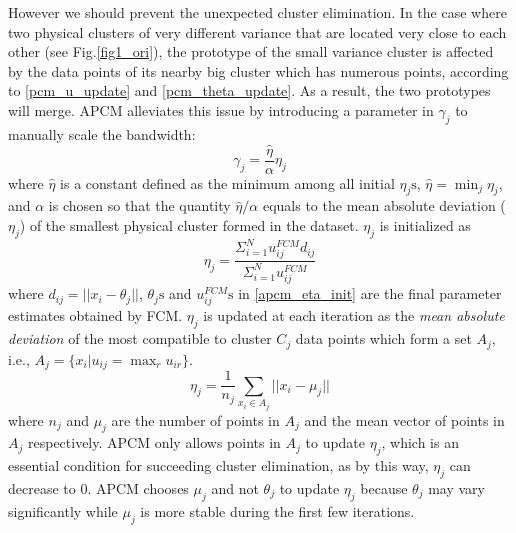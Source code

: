 \documentclass[journal]{IEEEtran}
\theoremstyle{definition}
\begin{document}
However we should prevent the unexpected cluster elimination. In the case where two physical clusters of very different variance that are located very close to each other (see Fig.\ref{fig1_ori}), the prototype of the small variance cluster is affected by the data points of its nearby big cluster which has numerous points, according to \eqref{pcm_u_update} and \eqref{pcm_theta_update}. As a result, the two prototypes will merge. APCM alleviates this issue by introducing a parameter in $\gamma_j$ to manually scale the bandwidth:
\begin{equation}
\label{corrected_eta}
\gamma_j=\frac{\hat{\eta}}{\alpha}\eta_j
\end{equation}
where $\hat{\eta}$ is a constant defined as the minimum among all initial $\eta_j\text{s}$, $\hat{\eta}=\min_j\eta_j$, and $\alpha$ is chosen so that the quantity $\hat{\eta}/\alpha$ equals to the mean absolute deviation ($\eta_j$)  of the smallest physical cluster formed in the dataset. $\eta_j$ is initialized as
\begin{equation}
\label{apcm_eta_init}
\eta_j=\frac{\Sigma_{i=1}^Nu_{ij}^{FCM}d_{ij}}{\Sigma_{i=1}^Nu_{ij}^{FCM}}  
\end{equation}
where $d_{ij}=||x_i-\theta_j||$, $\theta_j\text{s}$ and $u_{ij}^{FCM}\text{s}$ in \eqref{apcm_eta_init} are the final parameter estimates obtained by FCM. $\eta_j$ is updated at each iteration as the \emph{mean absolute deviation} of the most compatible to cluster $C_j$ data points which form a set $A_j$, i.e., $A_j=\{x_i|u_{ij}=\max_r u_{ir}\}$.
\begin{equation}
\label{apcm_eta_update}
\eta_j=\frac{1}{n_j}\sum_{x_i\in A_j}||x_i-\mu_j||
\end{equation}
where $n_j$ and $\mu_j$ are the number of points in $A_j$ and the mean vector of points in $A_j$ respectively. APCM only allows points in $A_j$ to update $\eta_j$, which is an essential condition for succeeding cluster elimination, as by this way, $\eta_j$ can decrease to $0$. APCM chooses $\mu_j$ and not $\theta_j$ to update $\eta_j$ because $\theta_j$ may vary significantly while $\mu_j$ is more stable during the first few iterations.
\end{document}
